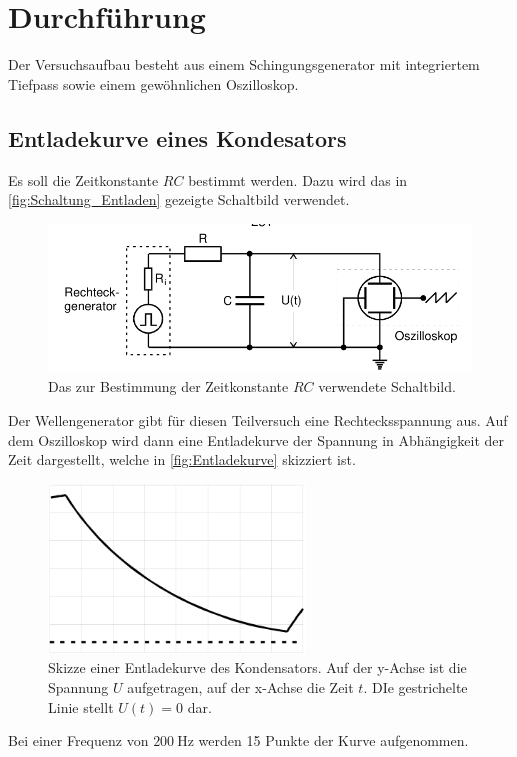\section{Durchführung}
\label{sec:Durchführung}
Der Versuchsaufbau besteht aus einem Schingungsgenerator mit 
integriertem Tiefpass sowie einem gewöhnlichen Oszilloskop.
\subsection{Entladekurve eines Kondesators}
Es soll die Zeitkonstante $RC$ bestimmt werden. Dazu wird das in 
\autoref{fig:Schaltung_Entladen} gezeigte Schaltbild verwendet.
\begin{figure}
    \centering
    \includegraphics[width=\textwidth]{messdaten/Schaltung_Entladung.png}
    \caption{Das zur Bestimmung der Zeitkonstante $RC$ verwendete Schaltbild.}
    \label{fig:Schalung_Entladung}
\end{figure}
Der Wellengenerator gibt für diesen Teilversuch eine Rechtecksspannung aus.
Auf dem Oszilloskop wird dann eine Entladekurve der Spannung in Abhängigkeit
der Zeit dargestellt, welche in \autoref{fig:Entladekurve} skizziert ist.
\begin{figure}
    \centering
    \includegraphics[height=4.5cm]{messdaten/Entladekurve.png}
    \caption{Skizze einer Entladekurve des Kondensators. Auf der y-Achse ist
    die Spannung $U$ aufgetragen, auf der x-Achse die Zeit $t$. DIe gestrichelte
    Linie stellt $U(t)=0$ dar.}
    \label{fig:Entladekurve}
\end{figure}
Bei einer Frequenz von $\qty{200}{\hertz}$ werden 15 Punkte der Kurve aufgenommen. 
